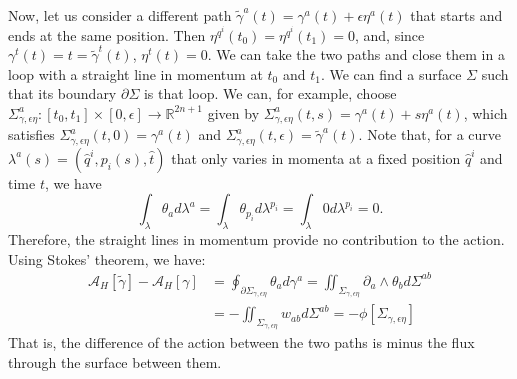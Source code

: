 \documentclass[12pt]{article}
\begin{document}
Now, let us consider a different path $\tilde \gamma^a(t) = \gamma^a(t) + \epsilon \eta^a(t)$ that starts and ends at the same position. Then $\eta^{q^i}(t_0)=\eta^{q^i}(t_1)=0$, and, since $\gamma^t(t) = t = \tilde\gamma^t(t)$, $\eta^t(t) = 0$. We can take the two paths and close them in a loop with a straight line in momentum at $t_0$ and $t_1$. We can find a surface $\Sigma$ such that its boundary $\partial \Sigma$ is that loop. We can, for example, choose $\Sigma^a_{\gamma, \epsilon \eta} : [t_0, t_1] \times [0,\epsilon] \to \mathbb{R}^{2n+1}$ given by $\Sigma^a_{\gamma, \epsilon \eta}(t,s) = \gamma^a(t) + s \eta^a(t)$, which satisfies $\Sigma^a_{\gamma, \epsilon \eta}(t,0) = \gamma^a(t)$ and $\Sigma^a_{\gamma, \epsilon \eta}(t,\epsilon) = \tilde \gamma^a(t)$. Note that, for a curve $\lambda^a(s) = (\hat{q}^i, p_i(s), \hat{t})$ that only varies in momenta at a fixed position $\hat{q}^i$ and time $t$, we have
\begin{equation}
    \int_{\lambda} \theta_a d\lambda^a = \int_{\lambda} \theta_{p_i} d\lambda^{p_i} = \int_{\lambda} 0 d\lambda^{p_i} =0.
\end{equation}
Therefore, the straight lines in momentum provide no contribution to the action. Using Stokes' theorem, we have:
\begin{equation}
    \begin{aligned}
        \mathcal{A}_H[\tilde \gamma] - \mathcal{A}_H[\gamma] &= \oint_{\partial \Sigma_{\gamma, \epsilon \eta}} \theta_a d \gamma^a
        =\iint_{\Sigma_{\gamma, \epsilon \eta}} \partial_a \wedge \theta_b d \Sigma^{ab} \\
        &= - \iint_{\Sigma_{\gamma, \epsilon \eta}} w_{ab} d \Sigma^{ab} = -\phi[\Sigma_{\gamma, \epsilon \eta}]
    \end{aligned}
\end{equation}
That is, the difference of the action between the two paths is minus the flux through the surface between them.
\end{document}
